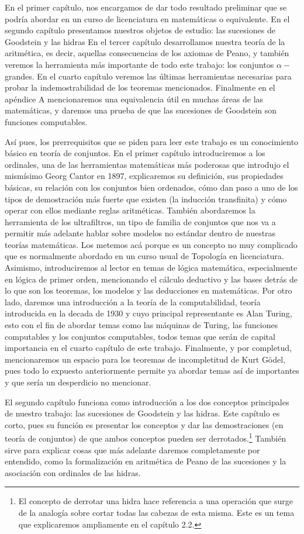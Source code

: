 En el primer capítulo, nos encargamos de dar todo resultado preliminar que se podría abordar en un curso de licenciatura en matemáticas o equivalente.
En el segundo capítulo presentamos nuestros objetos de estudio: las sucesiones de Goodstein y las hidras
En el tercer capítulo desarrollamos nuestra teoría de la aritmética, es decir, aquellas consecuencias de los axiomas de Peano, y también veremos la herramienta más importante de todo este trabajo: los conjuntos $\alpha-$grandes.
En el cuarto capítulo veremos las últimas herramientas necesarias para probar la indemostrabilidad de los teoremas mencionados.
Finalmente en el apéndice A mencionaremos una equivalencia útil en muchas áreas de las matemáticas, y daremos una prueba de que las sucesiones de Goodstein son funciones computables.

Así pues, los prerrequisitos que se piden para leer este trabajo es un conocimiento básico en teoría de conjuntos. En el primer capítulo introduciremos a los ordinales, una de las herramientas matemáticas más poderosas que introdujo el mismísimo Georg Cantor en 1897, explicaremos su definición, sus propiedades básicas, su relación con los conjuntos bien ordenados, cómo dan paso a uno de los tipos de demostración más fuerte que existen (la inducción transfinita) y cómo operar con ellos mediante reglas aritméticas.
También abordaremos la herramienta de los ultrafiltros, un tipo de familia de conjuntos que nos va a permitir más adelante hablar sobre modelos no estándar dentro de nuestras teorías matemáticas. Los metemos acá porque es un concepto no muy complicado que es normalmente abordado en un curso usual de Topología en licenciatura.
Asimismo, introduciremos al lector en temas de lógica matemática, especialmente en lógica de primer orden, mencionando el cálculo deductivo y las bases detrás de lo que son los teoremas, los modelos y las deducciones en matemáticas.
Por otro lado, daremos una introducción a la teoría de la computabilidad, teoría introducida en la decada de 1930 y cuyo principal representante es Alan Turing, esto con el fin de abordar temas como las máquinas de Turing, las funciones computables y los conjuntos computables, todos temas que serán de capital importancia en el cuarto capítulo de este trabajo.
Finalmente, y por completud, mencionaremos un espacio para los teoremas de incompletitud de Kurt Gödel, pues todo lo expuesto anteriormente permite ya abordar temas así de importantes y que sería un desperdicio no mencionar.

El segundo capítulo funciona como introducción a los dos conceptos principales de nuestro trabajo: las sucesiones de Goodstein y las hidras. Este capítulo es corto, pues su función es presentar los conceptos y dar las demostraciones (en teoría de conjuntos) de que ambos conceptos pueden ser derrotados.\footnote{El concepto de derrotar una hidra hace referencia a una operación que surge de la analogía sobre cortar todas las cabezas de esta misma. Este es un tema que explicaremos ampliamente en el capítulo 2.2.} También sirve para explicar cosas que más adelante daremos completamente por entendido, como la formalización en aritmética de Peano de las sucesiones y la asociación con ordinales de las hidras.

